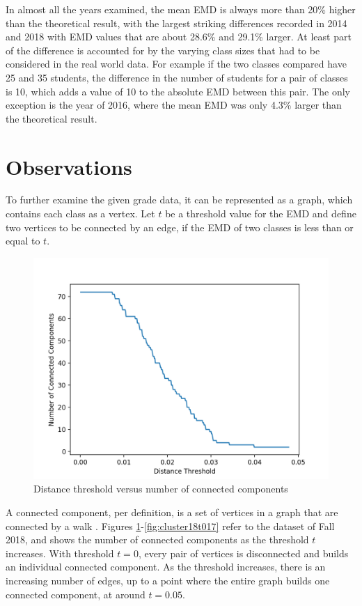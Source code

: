 \documentclass[12pt,letterpaper,oneside,openany]{book}
\begin{document}
In almost all the years examined, the mean EMD is always more than 20\% higher than the theoretical result, with the largest striking differences recorded in 2014 and 2018 with EMD values that are about 28.6\% and 29.1\% larger. At least part of the difference is accounted for by the varying class sizes that had to be considered in the real world data. For example if the two classes compared have 25 and 35 students, the difference in the number of students for a pair of classes is 10, which adds a value of  10 to the absolute EMD between this pair.
The only exception is the year of 2016, where the mean EMD was only 4.3\% larger than the theoretical result.


\setcounter{section}{1}
\section{Observations}
To further examine the given grade data, it can be represented as a graph, which contains each class as a vertex. Let $t$ be a threshold value for the EMD and define two vertices to be connected by an edge, if the EMD of two classes is less than or equal to $t$.

\begin{figure}
	\centering
	\includegraphics[width=\textwidth]{./images/n2018LLP.png}
	\caption{Distance threshold versus number of connected components }
	\label{fig:LLP18}
\end{figure}

A connected component, per definition, is a set of vertices in a graph that are connected by a walk \cite{porter2009communities}. 
Figures \ref{fig:LLP18}-\ref{fig:cluster18t017} refer to the dataset of Fall 2018, and shows the number of connected components as the threshold $t$ increases. With threshold $t=0$, every pair of vertices is disconnected and builds an individual connected component. As the threshold increases, there is an increasing number of edges, up to a point where the entire graph builds one connected component, at around $t=0.05$.
\end{document}
